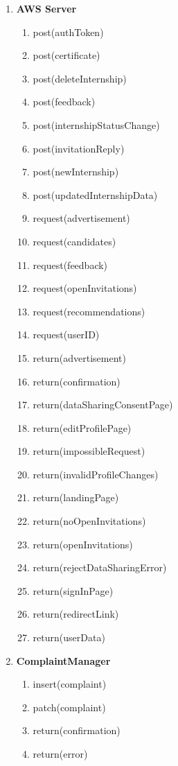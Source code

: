 \begin{enumerate}
\begin{enumerate}
    \end{enumerate}
    \item \textbf{AWS Server}
    \begin{enumerate}
        \item post(authToken)
        \item post(certificate)
        \item post(deleteInternship)
        \item post(feedback)
        \item post(internshipStatusChange)
        \item post(invitationReply)
        \item post(newInternship)
        \item post(updatedInternshipData)
        \item request(advertisement)
        \item request(candidates)
        \item request(feedback)
        \item request(openInvitations)
        \item request(recommendations)
        \item request(userID)
        \item return(advertisement)
        \item return(confirmation)
        \item return(dataSharingConsentPage)
        \item return(editProfilePage)
        \item return(impossibleRequest)
        \item return(invalidProfileChanges)
        \item return(landingPage)
        \item return(noOpenInvitations)
        \item return(openInvitations)
        \item return(rejectDataSharingError)
        \item return(signInPage)
        \item return(redirectLink)
        \item return(userData)
        
    \end{enumerate}
    \item \textbf{ComplaintManager}
    \begin{enumerate}
        \item insert(complaint)
        \item patch(complaint)
        \item return(confirmation)
        \item return(error)


\end{enumerate}
\end{enumerate}
